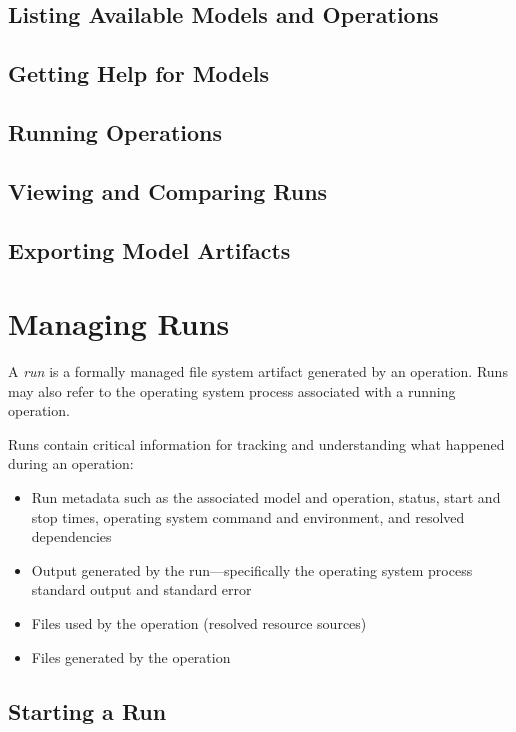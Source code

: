 \documentclass{article}
\begin{document}
\subsection{Listing Available Models and Operations}

\subsection{Getting Help for Models}

\subsection{Running Operations}

\subsection{Viewing and Comparing Runs}

\subsection{Exporting Model Artifacts}

\section{Managing Runs}
\label{sec:runs}

A \emph{run} is a formally managed file system artifact generated by
an operation. Runs may also refer to the operating system process
associated with a running operation.

Runs contain critical information for tracking and understanding what
happened during an operation:

\begin{itemize}
\item Run metadata such as the associated model and operation, status,
  start and stop times, operating system command and environment, and
  resolved dependencies
\item Output generated by the run---specifically the operating system
  process standard output and standard error
\item Files used by the operation (resolved resource sources)
\item Files generated by the operation
\end{itemize}

\subsection{Starting a Run}
\end{document}
